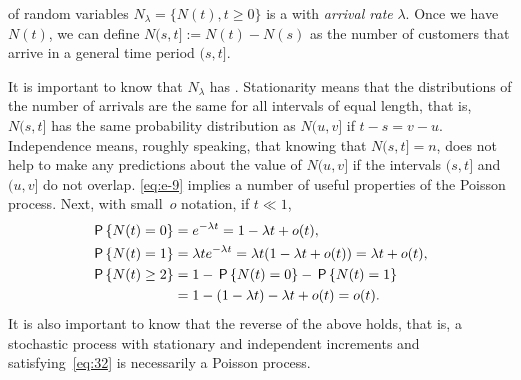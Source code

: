 \documentclass[stochastic-or.tex]{subfiles}
\begin{document}
 of random variables $N_\lambda=\{N(t), t\geq 0\}$ is a  with \emph{arrival rate} $\lambda$.
Once we have $N(t)$, we can define $N(s, t] := N(t)-N(s)$ as the number of customers that arrive in a general time period $(s, t]$.\sidenote{Note that $[0,t]$ is closed at both ends, but $(s,t]$ is open at the left.}

It is important to know that $N_\lambda$ has .
Stationarity means that the distributions of the number of arrivals are the same for all intervals of equal length, that is, $N(s,t]$ has the same probability distribution as $N(u, v]$ if $t-s = v-u$.
Independence means, roughly speaking, that knowing that $N(s,t]= n$, does not help to make any predictions about the value of $N(u, v]$ if the intervals $(s,t]$ and $(u, v]$ do not overlap.
\cref{eq:e-9} implies a number of useful properties of the Poisson process.
Next, with small~$o$ notation, if $t\ll 1$,
\begin{subequations}\label{eq:32}
\begin{align}
\P{N( t) = 0} &= e^{-\lambda t} = 1-\lambda  t + o( t), \\
\P{N( t) = 1} &= \lambda t e^{-\lambda t} = \lambda t (1-\lambda t + o(t)) = \lambda  t + o( t), \label{eq:8} \\
\P{N( t)  \geq 2} &= 1 - \P{N(t) = 0} - \P{N(t)= 1} \\
  &= 1 - (1-\lambda t) - \lambda t + o(t) = o(t). \label{eq:10}
\end{align}
\end{subequations}
It is also important to know that the reverse of the above holds, that is, a stochastic process with stationary and independent increments and satisfying~\cref{eq:32} is necessarily a Poisson process.
\end{document}
